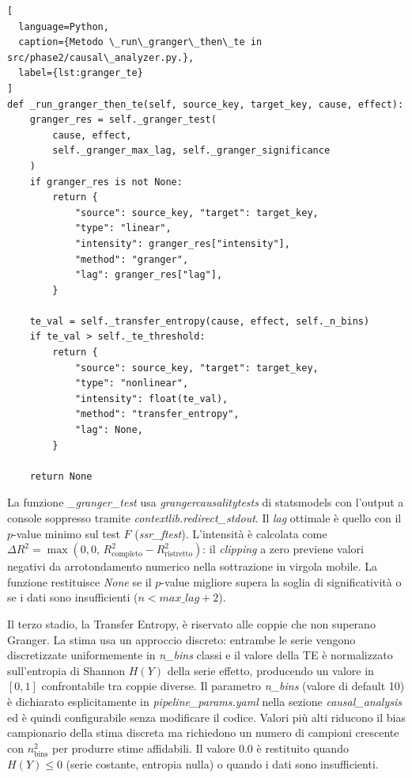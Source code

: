 \begin{lstlisting}[
  language=Python,
  caption={Metodo \_run\_granger\_then\_te in src/phase2/causal\_analyzer.py.},
  label={lst:granger_te}
]
def _run_granger_then_te(self, source_key, target_key, cause, effect):
    granger_res = self._granger_test(
        cause, effect,
        self._granger_max_lag, self._granger_significance
    )
    if granger_res is not None:
        return {
            "source": source_key, "target": target_key,
            "type": "linear",
            "intensity": granger_res["intensity"],
            "method": "granger",
            "lag": granger_res["lag"],
        }

    te_val = self._transfer_entropy(cause, effect, self._n_bins)
    if te_val > self._te_threshold:
        return {
            "source": source_key, "target": target_key,
            "type": "nonlinear",
            "intensity": float(te_val),
            "method": "transfer_entropy",
            "lag": None,
        }

    return None
\end{lstlisting}

La funzione \textit{\_granger\_test} usa \textit{grangercausalitytests} di statsmodels con
l'output a console soppresso tramite \textit{contextlib.redirect\_stdout}. Il \textit{lag}
ottimale è quello con il $p$-value minimo sul test $F$ (\textit{ssr\_ftest}). L'intensità è
calcolata come $\Delta R^2 = \max(0{,}0,\, R^2_{\text{completo}} - R^2_{\text{ristretto}})$:
il \textit{clipping} a zero previene valori negativi da arrotondamento numerico nella
sottrazione in virgola mobile. La funzione restituisce \textit{None} se il $p$-value migliore
supera la soglia di significatività o se i dati sono insufficienti ($n < \textit{max\_lag} + 2$).

Il terzo stadio, la Transfer Entropy, è riservato alle coppie che non superano Granger. 
La stima usa un approccio discreto: entrambe le serie vengono discretizzate uniformemente in
\textit{n\_bins} classi e il valore della TE è normalizzato sull'entropia di Shannon $H(Y)$
della serie effetto, producendo un valore in $[0, 1]$ confrontabile tra coppie diverse.
Il parametro \textit{n\_bins} (valore di default 10) è dichiarato esplicitamente in
\textit{pipeline\_params.yaml} nella sezione \textit{causal\_analysis} ed è quindi
configurabile senza modificare il codice. Valori più alti riducono il bias campionario
della stima discreta ma richiedono un numero di campioni crescente con $n_{\text{bins}}^2$
per produrre stime affidabili. Il valore 0.0 è restituito quando $H(Y) \leq 0$ (serie costante, entropia nulla) 
o quando i dati sono insufficienti.


